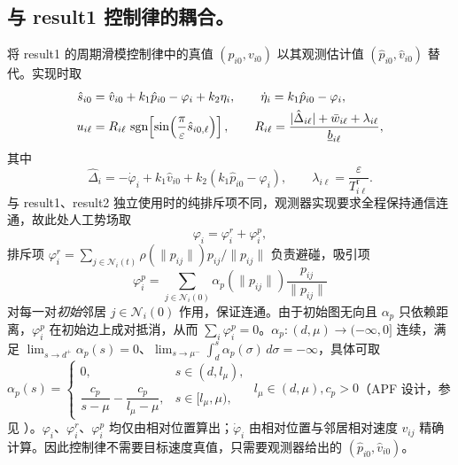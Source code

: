 \subsection{与 result1 控制律的耦合。}
将 result1 的周期滑模控制律中的真值 $(p_{i0},v_{i0})$ 以其观测估计值 $(\hat p_{i0},\hat v_{i0})$ 替代。实现时取
\begin{align*}
    \hat s_{i0}&=\hat v_{i0}+k_1\hat p_{i0}-\varphi_i+k_2\eta_i,\qquad \dot\eta_i=k_1\hat p_{i0}-\varphi_i,\\
    u_{i\ell}&=R_{i\ell}\,\operatorname{sgn}\!\left[\sin\!\left(\frac{\pi}{\varepsilon}\hat s_{i0,\ell}\right)\right],\qquad
    R_{i\ell}=\frac{|\hat\Delta_{i\ell}|+\bar w_{i\ell}+\lambda_{i\ell}}{\underline{b}_{i\ell}},
\end{align*}
其中
\[
    \hat\Delta_i=-\dot\varphi_i+k_1\hat v_{i0}+k_2(k_1\hat p_{i0}-\varphi_i),\qquad
    \lambda_{i\ell}=\frac{\varepsilon}{T^{\mathrm r}_{i\ell}}.
\]
与 result1、result2 独立使用时的纯排斥项不同，观测器实现要求全程保持通信连通，故此处人工势场取
\[
    \varphi_i=\varphi_i^r+\varphi_i^p,
\]
排斥项 $\varphi_i^r=\sum_{j\in\mathcal N_i(t)}\rho(\|p_{ij}\|)p_{ij}/\|p_{ij}\|$ 负责避碰，吸引项
\[
    \varphi_i^p=\sum_{j\in\mathcal N_i(0)}\alpha_p(\|p_{ij}\|)\frac{p_{ij}}{\|p_{ij}\|}
\]
对每一对\emph{初始}邻居 $j\in\mathcal N_i(0)$ 作用，保证连通。由于初始图无向且 $\alpha_p$ 只依赖距离，$\varphi_i^p$ 在初始边上成对抵消，从而 $\sum_i\varphi_i^p=0$。$\alpha_p:(d,\mu)\to(-\infty,0]$ 连续，满足 $\lim_{s\to d^+}\alpha_p(s)=0$、$\lim_{s\to\mu^-}\int_d^s\alpha_p(\sigma)\,d\sigma=-\infty$，具体可取 $\alpha_p(s)=\begin{cases}0,&s\in(d,l_\mu),\\[2pt]\dfrac{c_p}{s-\mu}-\dfrac{c_p}{l_\mu-\mu},&s\in[l_\mu,\mu),\end{cases}$ $l_\mu\in(d,\mu),c_p>0$（APF 设计，参见 \cite{chenCooperativeTargetfencingProtocol2019,panCooperativeTargetFencing2024a}）。$\varphi_i$、$\varphi_i^r$、$\varphi_i^p$ 均仅由相对位置算出；$\dot\varphi_i$ 由相对位置与邻居相对速度 $v_{ij}$ 精确计算。因此控制律不需要目标速度真值，只需要观测器给出的 $(\hat p_{i0},\hat v_{i0})$。

